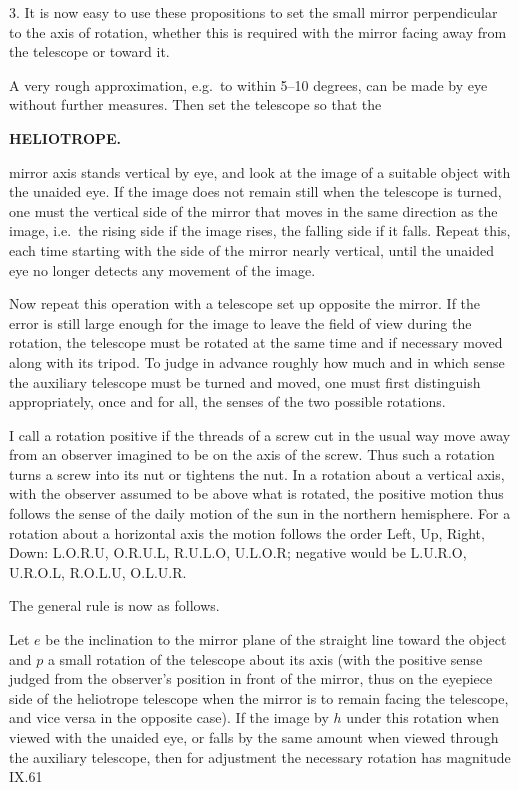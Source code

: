 3. It is now easy to use these propositions to set the small mirror
perpendicular to the axis of rotation, whether this is required with the
mirror facing away from the telescope or toward it.

A very rough approximation, e.g.\ to within 5--10 degrees, can be made by eye
without further measures. Then set the telescope so that the

\clearpage
\noindent\null\hfill{\small\textbf{HELIOTROPE.}}\hfill{}\par\medskip
\noindent mirror axis stands vertical by eye, and look at the image of a suitable
object with the unaided eye. If the image does not remain still when the
telescope is turned, one must  the vertical side of
the mirror that moves in the same direction as the image, i.e.\ the rising side
if the image rises, the falling side if it falls. Repeat this, each time
starting with the side of the mirror nearly vertical, until the unaided eye
no longer detects any movement of the image.

Now repeat this operation with a telescope set up opposite the mirror. If
the error is still large enough for the image to leave the field of view
during the rotation, the telescope must be rotated at the same time and
if necessary moved along with its tripod. To judge in advance roughly how
much and in which sense the auxiliary telescope must be turned and moved,
one must first distinguish appropriately, once and for all, the senses of
the two possible rotations.

I call a rotation positive if the threads of a screw cut in the usual way
move away from an observer imagined to be on the axis of the screw. Thus
such a rotation turns a screw into its nut or tightens the nut. In a rotation
about a vertical axis, with the observer assumed to be above what is rotated,
the positive motion thus follows the sense of the daily motion of the sun
in the northern hemisphere. For a rotation about a horizontal axis the
motion follows the order Left, Up, Right, Down: L.O.R.U,
O.R.U.L, R.U.L.O, U.L.O.R; negative would be L.U.R.O, U.R.O.L, R.O.L.U,
O.L.U.R.

The general rule is now as follows.

Let $e$ be the inclination to the mirror plane of the straight line toward
the object and $p$ a small rotation of the telescope about its axis (with the
positive sense judged from the observer's position in front of the mirror,
thus on the eyepiece side of the heliotrope telescope when the mirror is to
remain facing the telescope, and vice versa in the opposite case). If the
image  by $h$ under this rotation when viewed with the
unaided eye, or falls by the same amount when viewed through the auxiliary
telescope, then for adjustment the necessary rotation has magnitude
\vfill\noindent IX.\hfill61

